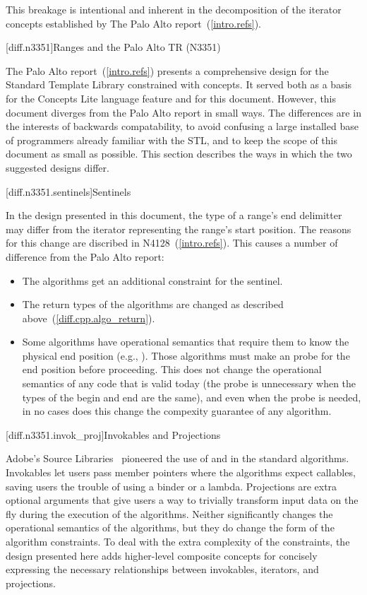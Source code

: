 \pnum
This breakage is intentional and inherent in the decomposition of the iterator concepts established
by The Palo Alto report~(\ref{intro.refs}).

[diff.n3351]{Ranges and the Palo Alto TR (N3351)}

\pnum
The Palo Alto report~(\ref{intro.refs}) presents a comprehensive design for the Standard Template
Library constrained with concepts. It served both as a basis for the Concepts Lite language feature
and for this document. However, this document diverges from the Palo Alto report in small ways. The
differences are in the interests of backwards compatability, to avoid confusing a large installed
base of programmers already familiar with the STL, and to keep the scope of this document as small
as possible. This section describes the ways in which the two suggested designs differ.

[diff.n3351.sentinels]{Sentinels}

\pnum
In the design presented in this document, the type of a range's end delimitter may differ from the
iterator representing the range's start position. The reasons for this change are discribed in
N4128~(\ref{intro.refs}). This causes a number of difference from the Palo Alto report:

\begin{itemize}
\item The algorithms get an additional constraint for the sentinel.
\item The return types of the algorithms are changed as described above~(\ref{diff.cpp.algo_return}).
\item Some algorithms have operational semantics that require them to know the
physical end position (e.g., ). Those algorithms must make an  probe for
the end position before proceeding. This does not change the operational semantics of any code that
is valid today (the probe is unnecessary when the types of the begin and end are the
same), and even when the probe is needed, in no cases does this change the compexity guarantee of
any algorithm.
\end{itemize}

[diff.n3351.invok_proj]{Invokables and Projections}

\pnum
Adobe's Source Libraries~\cite{ASL} pioneered the use of  and
 in the standard algorithms. Invokables let users pass member pointers
where the algorithms expect callables, saving users the trouble of using a binder or a lambda.
Projections are extra optional arguments that give users a way to trivially transform input data
on the fly during the execution of the algorithms. Neither significantly changes the operational
semantics of the algorithms, but they do change the form of the algorithm constraints. To deal with
the extra complexity of the constraints, the design presented here adds higher-level composite
concepts for concisely expressing the necessary relationships between invokables, iterators, and
projections.

